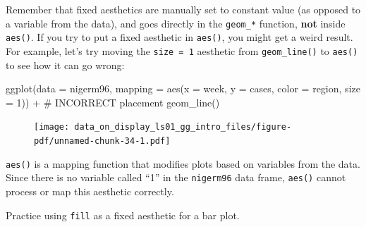 \documentclass[
  letterpaper,
  DIV=11,
  numbers=noendperiod]{scrreprt}
\newenvironment{Shaded}{\begin{snugshade}}{\end{snugshade}}
\newcommand{\AttributeTok}[1]{\textcolor[rgb]{0.40,0.45,0.13}{#1}}
\newcommand{\CommentTok}[1]{\textcolor[rgb]{0.37,0.37,0.37}{#1}}
\newcommand{\DecValTok}[1]{\textcolor[rgb]{0.68,0.00,0.00}{#1}}
\newcommand{\FunctionTok}[1]{\textcolor[rgb]{0.28,0.35,0.67}{#1}}
\newcommand{\NormalTok}[1]{\textcolor[rgb]{0.00,0.23,0.31}{#1}}
\newcommand{\SpecialCharTok}[1]{\textcolor[rgb]{0.37,0.37,0.37}{#1}}
\begin{document}
\begin{tcolorbox}[enhanced jigsaw, colframe=quarto-callout-caution-color-frame, rightrule=.15mm, opacityback=0, breakable, coltitle=black, colbacktitle=quarto-callout-caution-color!10!white, bottomrule=.15mm, leftrule=.75mm, toprule=.15mm, arc=.35mm, bottomtitle=1mm, colback=white, left=2mm, opacitybacktitle=0.6, titlerule=0mm, title=\textcolor{quarto-callout-caution-color}{\faFire}\hspace{0.5em}{Watch Out}, toptitle=1mm]

Remember that fixed aesthetics are manually set to constant value (as
opposed to a variable from the data), and goes directly in the
\texttt{geom\_*} function, \textbf{not} inside \texttt{aes()}. If you
try to put a fixed aesthetic in \texttt{aes()}, you might get a weird
result. For example, let's try moving the \texttt{size\ =\ 1} aesthetic
from \texttt{geom\_line()} to \texttt{aes()} to see how it can go wrong:

\begin{Shaded}
\begin{Highlighting}[]
\FunctionTok{ggplot}\NormalTok{(}\AttributeTok{data =}\NormalTok{ nigerm96, }
             \AttributeTok{mapping =} \FunctionTok{aes}\NormalTok{(}\AttributeTok{x =}\NormalTok{ week, }
                           \AttributeTok{y =}\NormalTok{ cases,}
                           \AttributeTok{color =}\NormalTok{ region,}
                           \AttributeTok{size =} \DecValTok{1}\NormalTok{)) }\SpecialCharTok{+}     \CommentTok{\# INCORRECT placement}
      \FunctionTok{geom\_line}\NormalTok{()}
\end{Highlighting}
\end{Shaded}

\begin{figure}[H]

{\centering \texttt{[image: data\_on\_display\_ls01\_gg\_intro\_files/figure-pdf/unnamed-chunk-34-1.pdf]}

}

\end{figure}

\texttt{aes()} is a mapping function that modifies plots based on
variables from the data. Since there is no variable called ``1'' in the
\texttt{nigerm96} data frame, \texttt{aes()} cannot process or map this
aesthetic correctly.

\end{tcolorbox}

Practice using \texttt{fill} as a fixed aesthetic for a bar plot.
\end{document}
